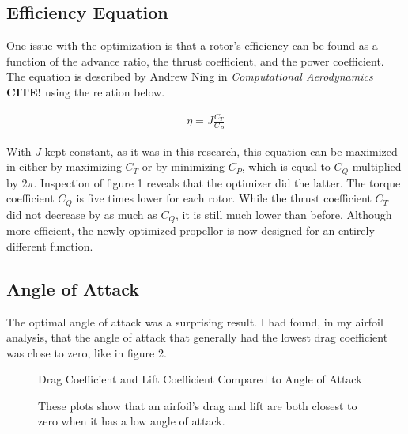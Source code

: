 \documentclass[journal ]{new-aiaa}
\begin{document}
\subsection{Efficiency Equation}

One issue with the optimization is that a rotor's efficiency can be found as a function of the advance ratio, the thrust coefficient, and the power coefficient. The equation is described by Andrew Ning in \emph{Computational Aerodynamics} \textbf{CITE!} using the relation below.

\begin{equation}
	\begin{aligned}
	\label{equation:3}
	\eta = J \frac{C_{T}}{C_{P}}
	\end{aligned}
\end{equation}

With $J$ kept constant, as it was in this research, this equation can be maximized in either by maximizing $C_{T}$ or by minimizing $C_{P}$, which is equal to $C_{Q}$ multiplied by $2 \pi$. Inspection of figure 1 reveals that the optimizer did the latter. The torque coefficient $C_{Q}$ is five times lower for each rotor. While the thrust coefficient $C_{T}$ did not decrease by as much as $C_{Q}$, it is still much lower than before. Although more efficient, the newly optimized propellor is now designed for an entirely different function.

\subsection{Angle of Attack}

The optimal angle of attack was a surprising result. I had found, in my airfoil analysis, that the angle of attack that generally had the lowest drag coefficient was close to zero, like in figure 2.   

\begin{figure}[H]
\centering
	\caption{Drag Coefficient and Lift Coefficient Compared to Angle of Attack}
	\captionsetup{aboveskip=0pt,font=it}
	\caption*{These plots show that an airfoil's drag and lift are both closest to zero when it has a low angle of attack.}
	\label{fig:2}
\end{figure}
\end{document}
